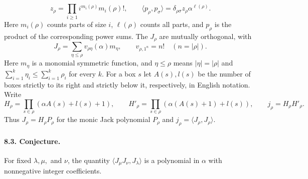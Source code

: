 %
\[
 z_\rho=\prod_{i\ge1}i^{m_i(\rho)}m_i(\rho)!,
 \qquad
 \langle p_\rho,p_\sigma\rangle
   =\delta_{\rho\sigma} z_\rho\alpha^{\ell(\rho)} .
\]
Here \(m_i(\rho)\) counts parts of size \(i\), \(\ell(\rho)\) counts
all parts, and \(p_\rho\) is the product of the corresponding power sums.
The \(J_\rho\) are mutually orthogonal, with
\[
 J_\rho=\sum_{\eta\le\rho}v_{\rho\eta}(\alpha)m_\eta,\qquad
 v_{\rho,1^n}=n! \quad(n=|\rho|).
\]
Here \(m_\eta\) is a monomial symmetric function, and \(\eta\le\rho\)
means \(|\eta|=|\rho|\) and
\(\sum_{i=1}^k\eta_i\le\sum_{i=1}^k\rho_i\) for every \(k\).
For a box \(s\) let \(A(s),l(s)\) be the number of boxes strictly
to its right and strictly below it, respectively, in English notation.
Write
\[
 H_\rho=\prod_{s\in\rho}(\alpha A(s)+l(s)+1),\qquad
 H'_\rho=\prod_{s\in\rho}(\alpha(A(s)+1)+l(s)),\qquad
 j_\rho=H_\rho H'_\rho .
\]
Thus \(J_\rho=H_\rho P_\rho\) for the monic Jack polynomial \(P_\rho\)
and \(j_\rho=\langle J_\rho,J_\rho\rangle\).

\paragraph{8.3. Conjecture.}
For fixed \(\lambda,\mu,\) and \(\nu\), the quantity
\(\langle J_\mu J_\nu,J_\lambda\rangle\) is a polynomial in
\(\alpha\) with nonnegative integer coefficients.


